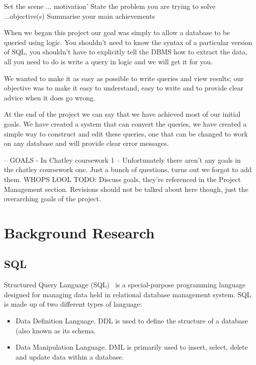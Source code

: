 \documentclass[a4paper, 11pt]{article}
\begin{document}
  Set the scene ... motivation'
  State the problem you are trying to solve ...objective(s)
  Summarise your main achievements 

When we began this project our goal was simply to allow a database to be 
queried using logic. You shouldn't need to know the syntax of a particular
version of SQL, you shouldn't have to explicitly tell the DBMS how to extract
the data, all you need to do is write a query in logic and we will
get it for you.

We wanted to make it as easy as possible to write queries and view results;
our objective was to make it easy to understand, easy to write and to
provide clear advice when it does go wrong.

At the end of the project we can say that we have achieved most of our initial 
goals. We have created a system that can convert the queries, we have created
a simple way to construct and edit these queries, one that can be changed to 
work on any database and will provide clear error messages.

  -- GOALS - In Chatley coursework 1 --
  Unfortunately there aren't any goals in the chatley coursework one.
  Just a bunch of questions, turns out we forgot to add them. WHOPS LOOL
  TODO: Discuss goals, they're referenced in the Project Management
  section. Revisions should not be talked about here though, just the
  overarching goals of the project.

\section{Background Research}
\subsection{SQL}
  Structured Query Language (SQL)~\cite{wiki:SQL} is a special-purpose
  programming language designed for managing data held in relational database
  management system. SQL is made up of two different types of language:

  \begin{itemize}
      \item
        Data Definition Language. DDL is used to define the structure of a
        database (also known as its schema.
      \item
        Data Manipulation Language. DML is primarily used to insert, select,
        delete and update data within a database.
  \end{itemize}
\end{document}
